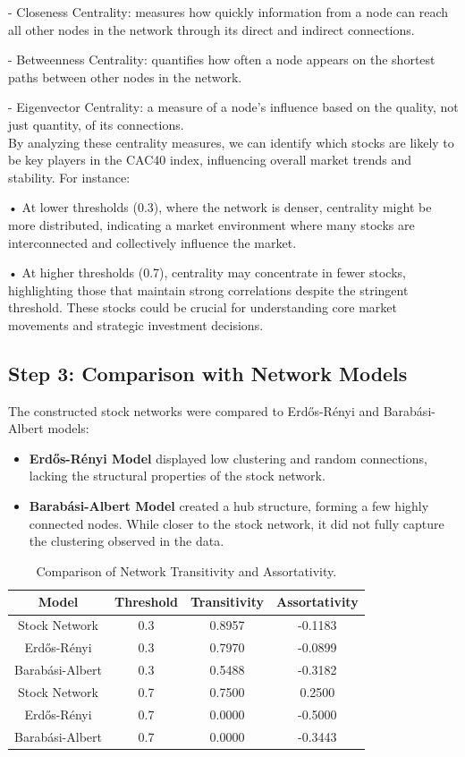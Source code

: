 \documentclass[12pt]{article}
\begin{document}
- Closeness Centrality: measures how quickly information from a node can reach all other nodes in the network through its direct and indirect connections. 

- Betweenness Centrality: quantifies how often a node appears on the shortest paths between other nodes in the network. 

- Eigenvector Centrality: a measure of a node's influence based on the quality, not just quantity, of its connections. \\

By analyzing these centrality measures, we can identify which stocks are likely to be key players in the CAC40 index, influencing overall market trends and stability. For instance:

•	At lower thresholds (0.3), where the network is denser, centrality might be more distributed, indicating a market environment where many stocks are interconnected and collectively influence the market.

•	At higher thresholds (0.7), centrality may concentrate in fewer stocks, highlighting those that maintain strong correlations despite the stringent threshold. These stocks could be crucial for understanding core market movements and strategic investment decisions.

\subsection{Step 3: Comparison with Network Models}
The constructed stock networks were compared to Erdős-Rényi and Barabási-Albert models:
\begin{itemize}
    \item \textbf{Erdős-Rényi Model} displayed low clustering and random connections, lacking the structural properties of the stock network.
    \item \textbf{Barabási-Albert Model} created a hub structure, forming a few highly connected nodes. While closer to the stock network, it did not fully capture the clustering observed in the data.
\end{itemize}

\begin{table}[H]
    \centering
    \begin{tabular}{|c|c|c|c|}
        \hline
        Model & Threshold & Transitivity & Assortativity \\
        \hline
        Stock Network & 0.3 & 0.8957 & -0.1183 \\
        Erdős-Rényi & 0.3 & 0.7970 & -0.0899 \\
        Barabási-Albert & 0.3 & 0.5488 & -0.3182 \\
        Stock Network & 0.7 & 0.7500 & 0.2500 \\
        Erdős-Rényi & 0.7 & 0.0000 & -0.5000 \\
        Barabási-Albert & 0.7 & 0.0000 & -0.3443 \\
        \hline
    \end{tabular}
    \caption{Comparison of Network Transitivity and Assortativity.}
\end{table}
\end{document}
